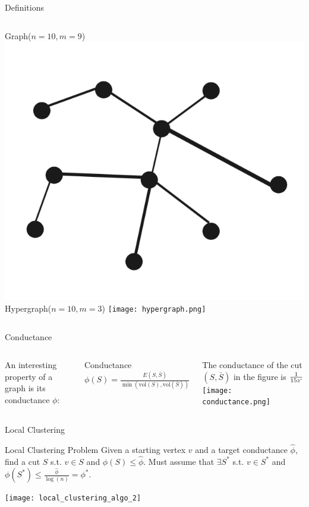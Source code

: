 \documentclass[../main.tex]{subfiles}
\begin{document}
	
	\begin{frame}{Definitions}
		\begin{columns}
				Graph($n=10, m=9$)
				\includegraphics[width=1.0\textwidth]{Figures/graph}
				Hypergraph($n=10, m=3$)
				\texttt{[image: hypergraph.png]}
		\end{columns}
	\end{frame}

    \begin{frame}{Conductance} 
    	\begin{columns}
    		\column{0.5\textwidth}
				An interesting property of a graph is its conductance $\phi$:
	
	           	\begin{block}{Conductance}
	           		$\phi(S) = \frac{E(S, \bar{S})}{\min(\text{vol}(S), \text{vol}(\bar{S}))}$
	           	\end{block}
           		
           		The conductance of the cut $(S, \bar{S})$ in the figure is $\frac{1}{15z`}$
	            \texttt{[image: conductance.png]}
        \end{columns}
    \end{frame}

	\begin{frame}{Local Clustering}
		\begin{block}{Local Clustering Problem}
			Given a starting vertex $v$ and a target conductance $\hat{\phi}$, find a cut $S$ s.t. $v\in S$ and $\phi(S) \leq \hat{\phi}$. Must assume that $\exists S^*$ s.t. $v\in S^*$ and $\phi(S^*) \leq \frac{\hat{\phi}}{\log(n)} = \phi^*$.
		\end{block}
		\texttt{[image: local\_clustering\_algo\_2]}
	\end{frame}
    
\end{document}
